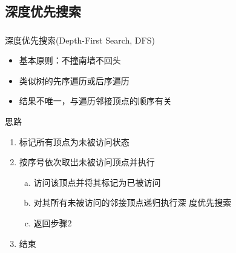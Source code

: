 \subsection{深度优先搜索}

\begin{frame}
    \frametitle{\insertsubsectionhead}
    \begin{block}{深度优先搜索(Depth-First Search, DFS)}
        \begin{itemize}
            \item 基本原则：不撞南墙不回头
            \item 类似树的先序遍历或后序遍历
            \item 结果不唯一，与遍历邻接顶点的顺序有关
        \end{itemize}
    \end{block}
    \begin{alertblock}{思路}
        \begin{enumerate}
            \item 标记所有顶点为\alert{未被访问}状态
            \item 按序号依次取出\alert{未被访问}顶点并执行
                  \begin{enumerate}[a.]
                      \item 访问该顶点并将其标记为\alert{已被访问}
                      \item 对其所有\alert{未被访问}的\alert{邻接}顶点递归执行深
                            度优先搜索
                      \item 返回步骤2
                  \end{enumerate}
            \item 结束
        \end{enumerate}
    \end{alertblock}
\end{frame}

